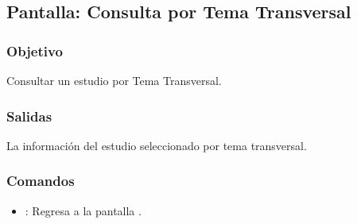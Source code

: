 \subsection{Pantalla: Consulta por Tema Transversal}
\subsubsection{Objetivo}
Consultar un estudio por Tema Transversal.



\subsubsection{Salidas}
La información del estudio seleccionado por tema transversal.
\subsubsection{Comandos}
\begin{itemize}
 \item {}: Regresa a la pantalla .
\end{itemize}






